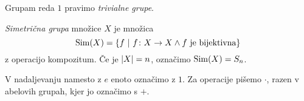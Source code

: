 \begin{definicija}
Grupam reda $1$ pravimo \emph{trivialne grupe}.
\end{definicija}

\begin{definicija}
\emph{Simetrična grupa} množice $X$ je množica
\[
\operatorname{Sim}(X)=\left\{f~\middle\vert~f\colon X\to X\land\text{$f$ je bijektivna}\right\}
\]
z operacijo kompozitum. Če je $\left\lvert X\right\rvert=n$, označimo $\operatorname{Sim}(X)=S_n$.
\end{definicija}

\begin{opomba}
V nadaljevanju namesto z $e$ enoto označimo z $1$. Za operacije pišemo $\cdot$, razen v abelovih grupah, kjer jo označimo s $+$.
\end{opomba}
